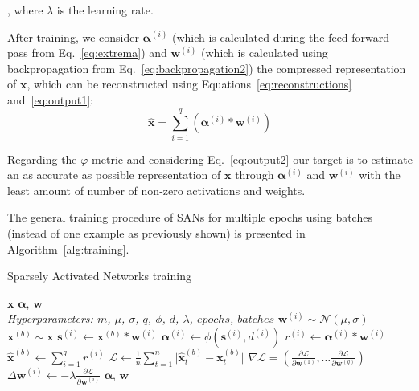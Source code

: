 \documentclass[journal]{IEEEtran}
\begin{document}
\noindent
, where $\lambda$ is the learning rate.

After training, we consider $\bm{\alpha}^{(i)}$ (which is calculated during the feed-forward pass from Eq.~\ref{eq:extrema}) and $\bm{w}^{(i)}$ (which is calculated using backpropagation from Eq.~\ref{eq:backpropagation2}) the compressed representation of $\bm{x}$, which can be reconstructed using Equations~\ref{eq:reconstructions} and~\ref{eq:output1}:
\begin{equation}
	\label{eq:output2}
	\hat{\bm{x}} = \sum\limits_{i=1}^q \left(\bm{\alpha}^{(i)} * \bm{w}^{(i)}\right)
\end{equation}

Regarding the $\varphi$ metric and considering Eq.~\ref{eq:output2} our target is to estimate an as accurate as possible representation of $\bm{x}$ through $\bm{\alpha}^{(i)}$ and $\bm{w}^{(i)}$ with the least amount of number of non-zero activations and weights.

The general training procedure of SANs for multiple epochs using batches (instead of one example as previously shown) is presented in Algorithm~\ref{alg:training}.

\begin{algorithm}[H]
	\caption{Sparsely Activated Networks training}
	\label{alg:training}
	\begin{algorithmic}[1]
		\renewcommand{\algorithmicrequire}{\textbf{Input:}}
		\renewcommand{\algorithmicensure}{\textbf{Output:}}
		\REQUIRE $\bm{x}$
		\ENSURE $\bm{\alpha}$, $\bm{w}$
		\\ \textit{Hyperparameters:  $m$, $\mu$, $\sigma$, $q$, $\phi$, $d$, $\lambda$, $epochs$, $batches$}
		\STATE $\bm{w}^{(i)} \sim \mathcal{N}(\mu, \sigma)$
		\ENDFOR
		\STATE $\bm{x}^{(b)} \sim \bm{x}$
		\STATE $\bm{s}^{(i)} \leftarrow \bm{x}^{(b)} * \bm{w}^{(i)}$
		\STATE $\bm{\alpha}^{(i)} \leftarrow \phi(\bm{s}^{(i)}, d^{(i)})$
		\STATE $r^{(i)} \leftarrow \bm{\alpha}^{(i)} * \bm{w}^{(i)}$
		\ENDFOR
		\STATE $\hat{\bm{x}}^{(b)} \leftarrow \sum\limits_{i=1}^q r^{(i)}$
		\STATE $\mathcal{L} \leftarrow \frac{1}{n}\sum\limits_{t=1}^n \lvert\hat{\bm{x}}^{(b)}_t - \bm{x}^{(b)}_t \rvert$
		\STATE $\nabla\mathcal{L} = \left( \frac{\partial\mathcal{L}}{\partial\bm{w}^{(1)}},\ldots\frac{\partial\mathcal{L}}{\partial\bm{w}^{(q)}}\right)$
		\STATE $\Delta\bm{w}^{(i)} \leftarrow -\lambda\frac{\partial\mathcal{L}}{\partial\bm{w}^{(i)}}$
		\ENDFOR
		\ENDFOR
		\RETURN $\bm{\alpha}$, $\bm{w}$
	\end{algorithmic}
\end{algorithm}
\end{document}
